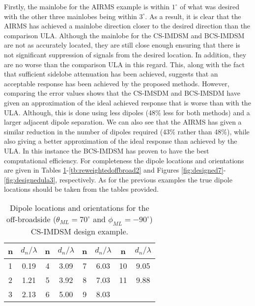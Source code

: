 \documentclass[10pt,final]{IEEEtran}
\begin{document}
Firstly, the mainlobe for the AIRMS example is within $1^{\circ}$ of what was desired with the other three mainlobes being within $3^{\circ}$.  As a result, it is clear that the AIRMS has achieved a mainlobe direction closer to the desired direction than the comparison ULA.  Although the mainlobe for the CS-IMDSM and BCS-IMDSM are not as accurately located, they are still close enough ensuring that there is not significant suppression of signals from the desired location.  In addition, they are no worse than the comparison ULA in this regard.  This, along with the fact that sufficient sidelobe attenuation has been achieved, suggests that an acceptable response has been achieved by the proposed methods.  However, comparing the error values shows that the CS-IMSDM and BCS-IMSDM have given an approximation of the ideal achieved response that is worse than with the ULA.  Although, this is done using less dipoles (48$\%$ less for both methods) and a larger adjacent dipole separation.  We can also see that the AIRMS has given a similar reduction in the number of dipoles required (43$\%$ rather than 48$\%$), while also giving a better approximation of the ideal response than achieved by the ULA.  In this instance the BCS-IMDSM has proven to have the best computational efficiency.  For completeness the dipole locations and orientations are given in Tables \ref{tb:CSoffbroad2}-\ref{tb:reweightedoffbroad2} and Figures \ref{fig:designed7}-\ref{fig:designedula3}, respectively.  As for the previous examples the true dipole locations should be taken from the tables provided.


\begin{table}
\caption{\rm Dipole locations and orientations for the off-broadside ($\theta_{ML}=70^{\circ}$ and $\phi_{ML}=-90^{\circ}$) CS-IMDSM design example.} \centering
\begin{tabular}{|c|c|c|c|c|c|c|c|}\hline
n  & $d_{n}/\lambda$ &  n & $d_{n}/\lambda$ &  n & $d_{n}/\lambda$ & n & $d_{n}/\lambda$\\
\hline
1  &  0.19  &  4 &  3.09    &  7 & 6.03   & 10 & 9.05 \\
\hline
2  & 1.21 &  5  &   3.92   &  8 &  7.03  & 11 & 9.88 \\
\hline
3  & 2.13 &   6  &  5.00   & 9 & 8.03 \\
\cline{1-6}
\end{tabular}
\label{tb:CSoffbroad2}
\end{table}
\end{document}
